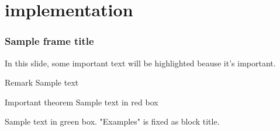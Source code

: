 \documentclass[9pt,aspectratio=54]{beamer}
\begin{document}
\section{implementation}

\begin{frame}
  \frametitle{Sample frame title}

  In this slide, some important text will be
  \alert{highlighted} beause it's important.

  \begin{block}{Remark}
    Sample text
  \end{block}

  \begin{alertblock}{Important theorem}
    Sample text in red box
  \end{alertblock}

  \begin{exampleblock}{}
    Sample text in green box. "Examples" is fixed as block title.
  \end{exampleblock}
\end{frame}



\begin{frame} %
  \frametitle{\bibname}
  \printbibliography
\end{frame}

%
\end{document}
